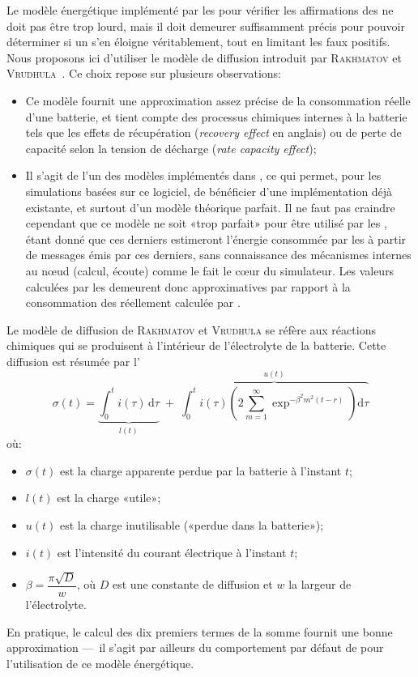 Le modèle énergétique implémenté par les \vns pour vérifier les affirmations des \cns ne doit pas être trop lourd, mais il doit demeurer suffisamment précis pour pouvoir déterminer si un \cn s'en éloigne véritablement, tout en limitant les faux positifs.
Nous proposons ici d'utiliser le modèle de diffusion introduit par \textsc{Rakhmatov} et \textsc{Vrudhula}~\cite{RV01}.\label{se:rakvru-formula}
Ce choix repose sur plusieurs observations:
\begin{itemize}
    \item Ce modèle fournit une approximation assez précise de la consommation réelle d'une batterie, et tient compte des processus chimiques internes à la batterie tels que les effets de récupération (\textit{recovery effect} en anglais) ou de perte de capacité selon la tension de décharge (\textit{rate capacity effect});
    \item Il s'agit de l'un des modèles implémentés dans \nsiii, ce qui permet, pour les simulations basées sur ce logiciel, de bénéficier d'une implémentation déjà existante, et surtout d'un modèle théorique parfait. Il ne faut pas craindre cependant que ce modèle ne soit «trop parfait» pour être utilisé par les \vns, étant donné que ces derniers estimeront l'énergie consommée par les \cns à partir de messages émis par ces derniers, sans connaissance des mécanismes internes au nœud (calcul, écoute) comme le fait le cœur du simulateur. Les valeurs calculées par les \vns demeurent donc approximatives par rapport à la consommation des \cns réellement calculée par \nsiii.
\end{itemize}
Le modèle de diffusion de \textsc{Rakhmatov} et \textsc{Vrudhula} se réfère aux réactions chimiques qui se produisent à l'intérieur de l'électrolyte de la batterie.
Cette diffusion est résumée par l'
\begin{equation}
    \label{se:eqn:rvdm}
    \sigma(t) = \underbrace{\int_{0}^{t} i(\tau) \, \mathrm d\tau}_{l(t)} \;+\; \overbrace{\int_{0}^{t} i(\tau) \left(2 \sum_{m=1}^{\infty} \exp^{-\beta^2 m^2 (t-r)} \right) \mathrm d\tau}^{u(t)}
\end{equation}
où:
\begin{itemize}
    \item $\sigma(t)$ est la charge apparente perdue par la batterie à l'instant $t$;
    \item $l(t)$ est la charge «utile»;
    \item $u(t)$ est la charge inutilisable («perdue dans la batterie»);
    \item $i(t)$ est l'intensité du courant électrique à l'instant $t$;
    \item $\beta = \dfrac{\pi\sqrt{D}}{w}$, où $D$ est une constante de diffusion et $w$ la largeur de l'électrolyte.
\end{itemize}
En pratique, le calcul des dix premiers termes de la somme fournit une bonne approximation ---~il s'agit par ailleurs du comportement par défaut de \nsiii pour l'utilisation de ce modèle énergétique.

